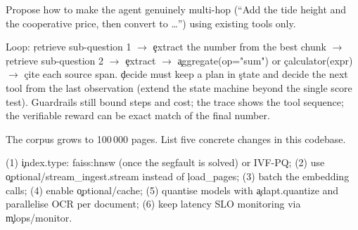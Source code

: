\begin{problem}[Redesign]
Propose how to make the agent genuinely multi-hop (``Add the tide height and the cooperative price, then convert to \dots'') using existing tools only.
\end{problem}
\begin{solution}
Loop: \c{retrieve} sub-question 1 $\to$ \c{extract} the number from the best chunk $\to$ \c{retrieve} sub-question 2 $\to$ \c{extract} $\to$ \c{aggregate(op="sum")} or \c{calculator(expr)} $\to$ \c{cite} each source span. \c{decide} must keep a plan in \c{state} and decide the next tool from the last observation (extend the state machine beyond the single score test). Guardrails still bound steps and cost; the trace shows the tool sequence; the verifiable reward can be exact match of the final number.
\end{solution}

\begin{problem}[Scaling]
The corpus grows to 100\,000 pages. List five concrete changes in this codebase.
\end{problem}
\begin{solution}
(1) \c{index.type: faiss:hnsw} (once the segfault is solved) or IVF-PQ; (2) use \c{optional/stream\_ingest.stream} instead of \c{load\_pages}; (3) batch the embedding calls; (4) enable \c{optional/cache}; (5) quantise models with \c{adapt.quantize} and parallelise OCR per document; (6) keep latency SLO monitoring via \c{mlops/monitor}.
\end{solution}
